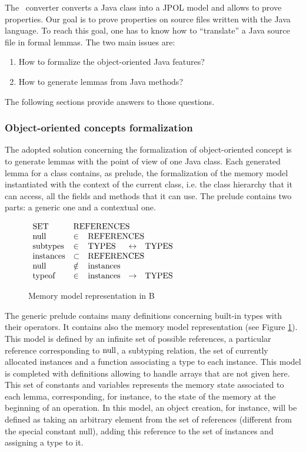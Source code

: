  The \JACK\ converter converts a Java class into a JPOL model and allows to
 prove properties. 
 Our goal is to prove properties on source files written with the Java
 language.  To reach this goal, one has to know how to ``translate'' a
 Java source file in formal lemmas.  The two main issues are:
\begin{enumerate}
 \item How to formalize the object-oriented Java features?
 \item How to generate lemmas from Java methods?
\end{enumerate}
The following sections provide answers to those questions.
\subsubsection{Object-oriented concepts formalization}
 The adopted solution concerning the formalization of object-oriented concept is to generate lemmas with the point of
 view of one Java class.
 Each generated lemma for a class contains, as prelude, the formalization of the memory model instantiated with the
context of the current class, i.e. the class hierarchy that it can access, all the fields and methods that it
can use. The prelude contains two parts: a generic one and a contextual one.
 \begin{figure}[thp]
\begin{center}
 $\begin{array}{lllll}
 \rm{SET} & \multicolumn{4}{l}{\rm{REFERENCES}} \\
 \rm{null} & \in & \multicolumn{3}{l}{\rm{REFERENCES}} \\
 \rm{subtypes} & \in & \rm{TYPES} & \leftrightarrow & \rm{TYPES} \\
 \rm{instances} & \subset & \multicolumn{3}{l}{\rm{REFERENCES}} \\
 \rm{null} & \notin & \multicolumn{3}{l}{\rm{instances}} \\
 \rm{typeof} & \in & \rm{instances} & \rightarrow & \rm{TYPES}
 \end{array}$
\end{center}
 \caption{Memory model representation in B}
 \label{Memory model representation}
\end{figure}

 The generic prelude contains many definitions concerning built-in types with their operators.
 It contains also the memory model representation (see Figure \ref{Memory model representation}). This model is defined
 by an infinite set of possible
 references, a particular reference corresponding to $\rm{null}$, a subtyping relation, the set of currently allocated
instances and a function associating a type to each instance.
 This model is completed with definitions allowing to handle arrays that are not given here.
 This set of constants and variables represents the memory state associated to each lemma, corresponding, for instance, to
the state of the memory at the beginning of an operation.
 In this model, an object creation, for instance, will be defined as taking an
arbitrary element from the set of references (different from the special constant null), adding this reference
to the set of instances and assigning a type to it.

